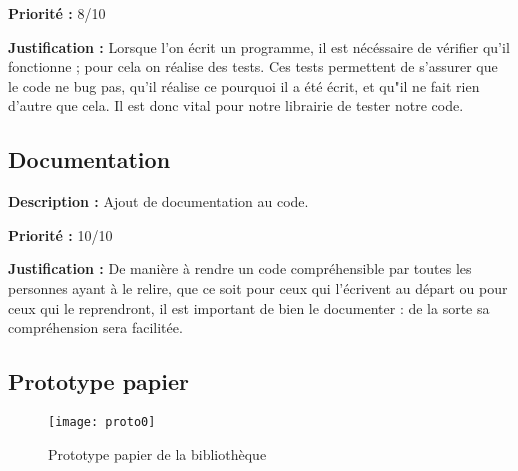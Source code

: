 \begin{titlepage}
{\textbf{Priorité :} 8/10

\textbf{Justification :} Lorsque l'on écrit un programme, il est nécéssaire de vérifier qu'il fonctionne ; pour cela on réalise des tests. Ces tests permettent de s'assurer que le code ne bug pas, qu'il réalise ce pourquoi il a été écrit, et qu"il ne fait rien d'autre que cela. Il est donc vital pour notre librairie de tester notre code.
}

\subsection{Documentation}

{
\textbf{Description :} Ajout de documentation au code.

\textbf{Priorité :} 10/10

\textbf{Justification :} De manière à rendre un code compréhensible par toutes les personnes ayant à le relire, que ce soit pour ceux qui l'écrivent au départ ou pour ceux qui le reprendront, il est important de bien le documenter : de la sorte sa compréhension sera facilitée.
}

\vspace{1cm}
\subsection{Prototype papier}

\begin{figure}[h]
\centering
\texttt{[image: proto0]}
\caption{Prototype papier de la bibliothèque}
\end{figure}


\end{titlepage}
